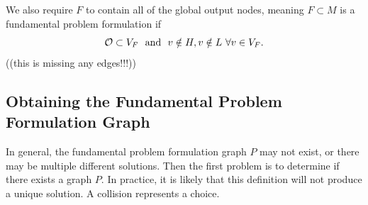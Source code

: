 We also require $F$ to contain all of the global output nodes, meaning $F\subset M$ is a fundamental problem formulation if
\begin{equation}
\mathcal O \subset V_F \ \textrm{ and } \ v \notin H, v \notin L \ \forall v \in V_F.
\end{equation}
((this is missing any edges!!!))
\subsection{Obtaining the Fundamental Problem Formulation Graph}
In general, the fundamental problem formulation graph $P$ may not exist, or there may be multiple different solutions. Then the first problem is to determine if there exists a graph $P$.
In practice, it is likely that this definition will not produce a unique solution. 
A collision represents a choice.





